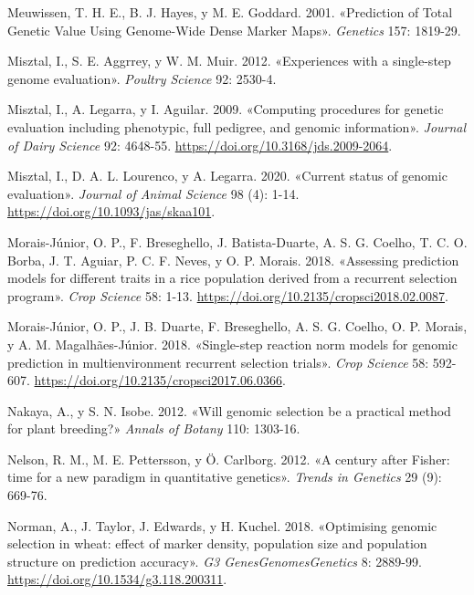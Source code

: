 \documentclass[11pt,spanish,a4paper,oneside,]{book} %
\begin{document}
\leavevmode\hypertarget{ref-cite:8}{}%
Meuwissen, T. H. E., B. J. Hayes, y M. E. Goddard. 2001. «Prediction of Total Genetic Value Using Genome-Wide Dense Marker Maps». \emph{Genetics} 157: 1819-29.

\leavevmode\hypertarget{ref-cite:14}{}%
Misztal, I., S. E. Aggrrey, y W. M. Muir. 2012. «Experiences with a single-step genome evaluation». \emph{Poultry Science} 92: 2530-4.

\leavevmode\hypertarget{ref-cite:16}{}%
Misztal, I., A. Legarra, y I. Aguilar. 2009. «Computing procedures for genetic evaluation including phenotypic, full pedigree, and genomic information». \emph{Journal of Dairy Science} 92: 4648-55. \url{https://doi.org/10.3168/jds.2009-2064}.

\leavevmode\hypertarget{ref-cite:18}{}%
Misztal, I., D. A. L. Lourenco, y A. Legarra. 2020. «Current status of genomic evaluation». \emph{Journal of Animal Science} 98 (4): 1-14. \url{https://doi.org/10.1093/jas/skaa101}.

\leavevmode\hypertarget{ref-cite:68}{}%
Morais-Júnior, O. P., F. Breseghello, J. Batista-Duarte, A. S. G. Coelho, T. C. O. Borba, J. T. Aguiar, P. C. F. Neves, y O. P. Morais. 2018. «Assessing prediction models for different traits in a rice population derived from a recurrent selection program». \emph{Crop Science} 58: 1-13. \url{https://doi.org/10.2135/cropsci2018.02.0087}.

\leavevmode\hypertarget{ref-cite:69}{}%
Morais-Júnior, O. P., J. B. Duarte, F. Breseghello, A. S. G. Coelho, O. P. Morais, y A. M. Magalhães-Júnior. 2018. «Single-step reaction norm models for genomic prediction in multienvironment recurrent selection trials». \emph{Crop Science} 58: 592-607. \url{https://doi.org/10.2135/cropsci2017.06.0366}.

\leavevmode\hypertarget{ref-cite:6}{}%
Nakaya, A., y S. N. Isobe. 2012. «Will genomic selection be a practical method for plant breeding?» \emph{Annals of Botany} 110: 1303-16.

\leavevmode\hypertarget{ref-cite:2}{}%
Nelson, R. M., M. E. Pettersson, y Ö. Carlborg. 2012. «A century after Fisher: time for a new paradigm in quantitative genetics». \emph{Trends in Genetics} 29 (9): 669-76.

\leavevmode\hypertarget{ref-cite:78}{}%
Norman, A., J. Taylor, J. Edwards, y H. Kuchel. 2018. «Optimising genomic selection in wheat: effect of marker density, population size and population structure on prediction accuracy». \emph{G3 Genes\textbar{}Genomes\textbar{}Genetics} 8: 2889-99. \url{https://doi.org/10.1534/g3.118.200311}.
\end{document}
